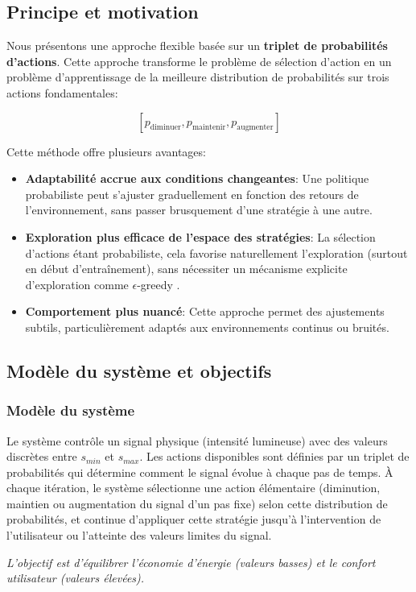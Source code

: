 \documentclass[a4paper,11pt]{article}
\begin{document}
\subsection{Principe et motivation}

Nous présentons une approche flexible basée sur un \textbf{triplet de probabilités d'actions}. Cette approche transforme le problème de sélection d'action en un problème d'apprentissage de la meilleure distribution de probabilités sur trois actions fondamentales:

$$[p_{\text{diminuer}}, p_{\text{maintenir}}, p_{\text{augmenter}}]$$

Cette méthode offre plusieurs avantages:
\begin{itemize}
    \item \textbf{Adaptabilité accrue aux conditions changeantes}: Une politique probabiliste peut s'ajuster graduellement en fonction des retours de l'environnement, sans passer brusquement d'une stratégie à une autre.
    
    \item \textbf{Exploration plus efficace de l'espace des stratégies}: La sélection d'actions étant probabiliste, cela favorise naturellement l'exploration (surtout en début d'entraînement), sans nécessiter un mécanisme explicite d'exploration comme $\epsilon$-greedy \cite{ThePolicyGradientTheorem}.
    
    \item \textbf{Comportement plus nuancé}: Cette approche permet des ajustements subtils, particulièrement adaptés aux environnements continus ou bruités.
\end{itemize}

\subsection{Modèle du système et objectifs}

\subsubsection{Modèle du système}

Le système contrôle un signal physique (intensité lumineuse) avec des valeurs discrètes entre $s_{min}$ et $s_{max}$. Les actions disponibles sont définies par un triplet de probabilités qui détermine comment le signal évolue à chaque pas de temps. À chaque itération, le système sélectionne une action élémentaire (diminution, maintien ou augmentation du signal d'un pas fixe) selon cette distribution de probabilités, et continue d'appliquer cette stratégie jusqu'à l'intervention de l'utilisateur ou l'atteinte des valeurs limites du signal.
\begin{mdframed}
\textit{L'objectif est d'équilibrer l'économie d'énergie (valeurs basses) et le confort utilisateur (valeurs élevées).}
\end{mdframed}
\end{document}
